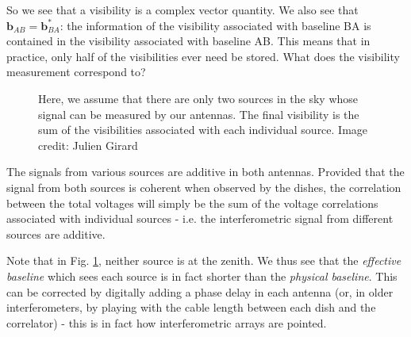 \pg
So we see that a visibility is a complex vector quantity. We also see that $\mathbf{b}_{AB} = \mathbf{b}_{BA}^*$: the information of the visibility associated with baseline BA is contained in the visibility associated with baseline AB. This means that in practice, only half of the visibilities ever need be stored. What does the visibility measurement correspond to?
\begin{figure}[ht]
\centering
{}
\caption{\label{fig.visibility.measure} Here, we assume that there are only two sources in the sky whose signal can be measured by our antennas. The final visibility is the sum of the visibilities associated with each individual source. Image credit: Julien Girard}
\end{figure}

\pg
The signals from various sources are additive in both antennas. Provided that the signal from both sources is coherent when observed by the dishes, the correlation between the total voltages will simply be the sum of the voltage correlations associated with individual sources - i.e. the interferometric signal from different sources are additive.

\pg
Note that in Fig. \ref{fig.visibility.measure}, neither source is at the zenith. We thus see that the \emph{effective baseline} which sees each source is in fact shorter than the \emph{physical baseline}. This can be corrected by digitally adding a phase delay in each antenna (or, in older interferometers, by playing with the cable length between each dish and the correlator) - this is in fact how interferometric arrays are pointed.

